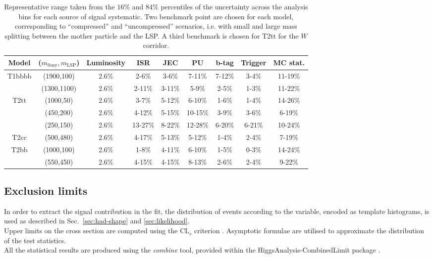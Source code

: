 \begin{table}[h!]
    \caption{Representative range taken from the $16\%$ and $84\%$ percentiles
        of the uncertainty across the analysis bins for each source of signal
        systematic. Two benchmark point are chosen for each model, corresponding
        to ``compressed'' and ``uncompressed'' scenarios, i.e. with small and
        large mass splitting between the mother particle and the LSP. A third
        benchmark is chosen for T2tt for the $W$ corridor.}
    \label{tab:sig-systematics}
    \centering
    \begin{tabular}{ ccccccccc }
        \hline \hline
        Model & ($m_{\mathrm{Susy}},m_{\mathrm{LSP}}$) & Luminosity & ISR & JEC & PU & b-tag & Trigger & MC stat. \\ \hline
        \multirow{2}{*}{T1bbbb}
            & (1900,100)  & 2.6\% & 2-6\%  & 3-6\%  & 7-11\% & 7-12\% & 3-4\% & 11-19\% \\ 
            & (1300,1100) & 2.6\% & 2-11\% & 3-11\% & 5-9\%  & 2-5\%  & 1-3\% & 11-22\% \\
        \hline
        \multirow{2}{*}{T2tt}
            & (1000,50) & 2.6\% & 3-7\%   & 5-12\% & 6-10\%  & 1-6\%  & 1-4\%  & 14-26\% \\ 
            & (450,200) & 2.6\% & 4-12\%  & 5-15\% & 10-15\% & 3-9\%  & 3-6\%  & 6-19\%  \\
            & (250,150) & 2.6\% & 13-27\% & 8-22\% & 12-28\% & 6-20\% & 6-21\% & 10-24\% \\
        \hline
        \multirow{1}{*}{T2cc}
            & (500,480) & 2.6\% & 4-17\% & 5-13\% & 5-12\% & 1-4\% & 2-4\% & 7-19\% \\
        \hline
        \multirow{2}{*}{T2bb}
            & (1000,100) & 2.6\% & 1-8\%  & 4-11\% & 6-10\% & 1-5\% & 0-3\% & 14-24\% \\ 
            & (550,450)  & 2.6\% & 4-15\% & 4-15\% & 8-13\% & 2-6\% & 2-4\% & 9-22\%  \\
        \hline \hline
    \end{tabular}
\end{table}

\subsection{Exclusion limits}
\label{sec:susy_results}
In order to extract the signal contribution in the fit, the distribution of
events according to the \mht variable, encoded as template histograms, is used
as described in Sec.~\ref{sec:had-shape} and \ref{sec:likelihood}. \\
Upper limits on the cross section are computed using the $\text{CL}_{s}$
criterion \cite{CLsTechnique}. Asymptotic formulae \cite{AsymptoticFormulae} are
utilised to approximate the distribution of the test statistics. \\
All the statistical results are produced using the \textit{combine} tool,
provided within the HiggsAnalysis-CombinedLimit package \cite{Combine}.

